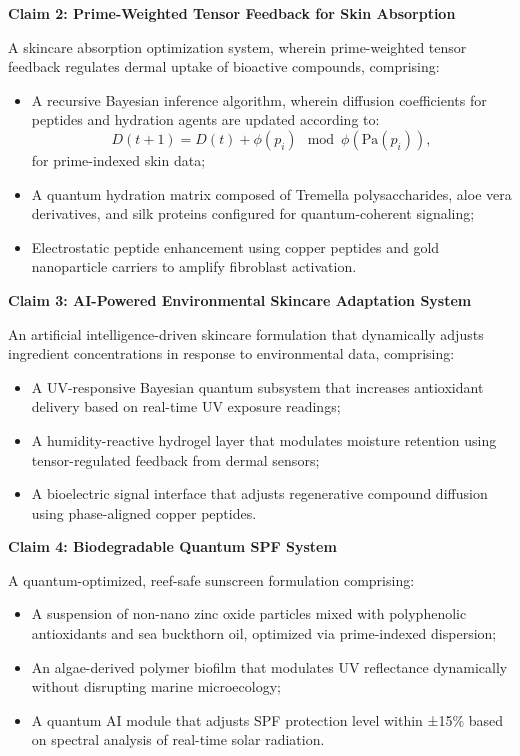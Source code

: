\documentclass{article}
\theoremstyle{plain}
\theoremstyle{claimstyle}
\begin{document}
\textbf{Claim 2: Prime-Weighted Tensor Feedback for Skin Absorption}  

A skincare absorption optimization system, wherein prime-weighted tensor feedback regulates dermal uptake of bioactive compounds, comprising:  
\begin{itemize}
    \item A recursive Bayesian inference algorithm, wherein diffusion coefficients for peptides and hydration agents are updated according to:
    \[
    D(t+1) = D(t) + \phi(p_i) \mod \phi(\text{Pa}(p_i)),
    \]
    for prime-indexed skin data;
    \item A quantum hydration matrix composed of Tremella polysaccharides, aloe vera derivatives, and silk proteins configured for quantum-coherent signaling;
    \item Electrostatic peptide enhancement using copper peptides and gold nanoparticle carriers to amplify fibroblast activation.
\end{itemize}

\textbf{Claim 3: AI-Powered Environmental Skincare Adaptation System}  

An artificial intelligence-driven skincare formulation that dynamically adjusts ingredient concentrations in response to environmental data, comprising:  
\begin{itemize}
    \item A UV-responsive Bayesian quantum subsystem that increases antioxidant delivery based on real-time UV exposure readings;
    \item A humidity-reactive hydrogel layer that modulates moisture retention using tensor-regulated feedback from dermal sensors;
    \item A bioelectric signal interface that adjusts regenerative compound diffusion using phase-aligned copper peptides.
\end{itemize}

\textbf{Claim 4: Biodegradable Quantum SPF System}  

A quantum-optimized, reef-safe sunscreen formulation comprising:  
\begin{itemize}
    \item A suspension of non-nano zinc oxide particles mixed with polyphenolic antioxidants and sea buckthorn oil, optimized via prime-indexed dispersion;
    \item An algae-derived polymer biofilm that modulates UV reflectance dynamically without disrupting marine microecology;
    \item A quantum AI module that adjusts SPF protection level within ±15\% based on spectral analysis of real-time solar radiation.
\end{itemize}
\end{document}
